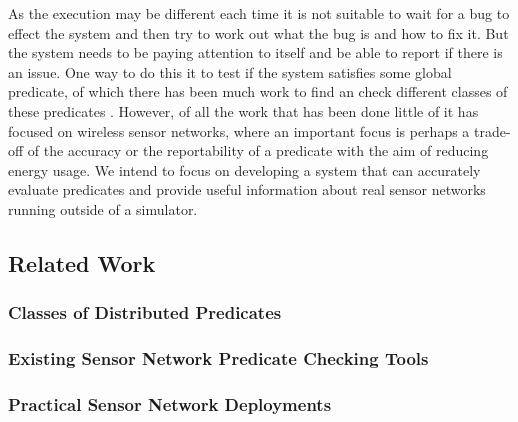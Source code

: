 As the execution may be different each time it is not suitable to wait for a bug to effect the system and then try to work out what the bug is and how to fix it. But the system needs to be paying attention to itself and be able to report if there is an issue. One way to do this it to test if the system satisfies some global predicate, of which there has been much work to find an check different classes of these predicates \cite{553309,345831,277788}. However, of all the work that has been done little of it has focused on wireless sensor networks, where an important focus is perhaps a trade-off of the accuracy or the reportability of a predicate with the aim of reducing energy usage. We intend to focus on developing a system that can accurately evaluate predicates and provide useful information about real sensor networks running outside of a simulator.


\subsection{Related Work}

\subsubsection*{Classes of Distributed Predicates}

\begin{comment}
\cite{1382572, 749477, ?}. However, in distributed systems there are additional challenges to overcome \cite{5010224}

What can be meant by `detecting bugs', in non-distributed systems there are many different classes of bugs \cite{?}, when we consider distributed systems many of those bugs have new vectors in which they can arise. For example deadlock can now occur across motes if both motes are waiting on receiving a message the other mote should be sending. The fact that these systems are distributed means that debugging these kind of problems becomes harder \cite{?}. Also there are new ways bugs can arise, for example in the routing of information, if a message being sent is stuck being transmitted in a cycle of nodes it will never reach its destination. This type of problem requires lots of resources (either memory or large messages) to be able to effectively debug \cite{?}.
\end{comment}


\subsubsection*{Existing Sensor Network Predicate Checking Tools}


\subsubsection*{Practical Sensor Network Deployments}



